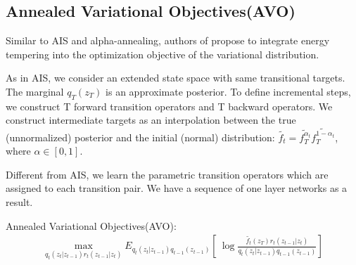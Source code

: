\documentclass[10pt,letterpaper]{article}
\begin{document}
\subsection*{Annealed Variational Objectives(AVO)}

Similar to AIS and alpha-annealing, authors of \cite{main_Huang2018ImprovingEI} propose to integrate energy tempering into the optimization objective of the variational distribution. 

As in AIS, we consider an extended state space with same transitional targets.
The marginal $q_T(z_T)$ is an approximate posterior. 
To define incremental steps, we construct T forward transition operators and T backward operators. 
We construct intermediate targets
as an interpolation between the true (unnormalized) posterior and the initial (normal) distribution:
$\tilde{f_t} = \tilde{f_T^{\alpha_t}}\tilde{f_T^{1 - \alpha_t}}$, where $\alpha \in [0, 1]$. 



Different from AIS, we learn the parametric transition operators which are assigned to each transition pair. We have a sequence of one layer networks as a result.

Annealed Variational Objectives(AVO):
\begin{align*}
    \max_{q_t(z_t| z_{t-1})r_{t}(z_{t-1} | z_t)} E_{q_t(z_t| z_{t-1})q_{t-1}(z_{t-1})}[\ 
    \log \frac{\tilde{f_t}(z_T) r_{t}(z_{t-1} | z_t)}{q_t(z_t| z_{t-1})q_{t-1}(z_{t-1})} ]
\end{align*}

    

\nolinenumbers



\end{document}
